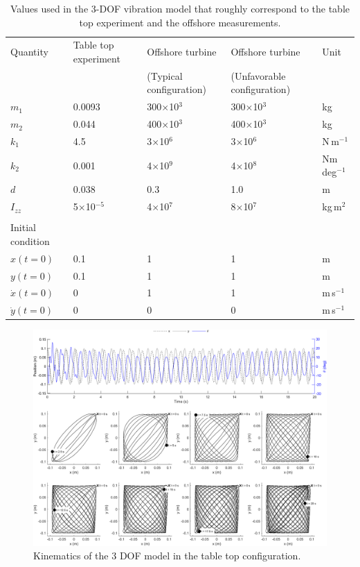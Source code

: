 \documentclass{article}
\begin{document}
\begin{table}[]
    \centering
    \begin{tabular}{l l l ll }
    \toprule
         Quantity & Table top experiment & Offshore turbine &  Offshore turbine & Unit \\
         & & (Typical configuration) & (Unfavorable configuration)\\
         \midrule
         $m_1$ & 0.0093 & 300$\times$10$^3$ & 300$\times$10$^3$ & kg\\ 
         $m_2$ & 0.044 & 400$\times$10$^3$ & 400$\times$10$^3$ & kg\\ 
         $k_1$ & 4.5 & 3$\times$10$^6$ & 3$\times$10$^6$ & N\,m$^{-1}$ \\ 
         $k_2$ & 0.001 & 4$\times$10$^9$ & 4$\times$10$^8$ & Nm\,deg$^{-1}$ \\ 
         $d$ & 0.038 & 0.3 & 1.0 & m\\ 
         $I_{zz}$ & 5$\times$10$^{-5}$ & 4$\times$10$^7$ & 8$\times$10$^7$ & kg\,m$^2$ \\
         \\
         Initial condition & \\
         \midrule
         $x(t=0)$ & 0.1 & 1 & 1 & m\\ 
         $y(t=0)$ & 0.1 & 1 & 1 & m\\
         $\dot{x}(t=0)$ & 0 & 1 & 1 & m\,s$^{-1}$ \\
         $\dot{y}(t=0)$ & 0 & 0 & 0 & m\,s$^{-1}$ \\
         \bottomrule
    \end{tabular}
    \caption{Values used in the 3-DOF vibration model that roughly correspond to the table top experiment and the offshore measurements.}
    \label{tab:3dof-variable-values}
\end{table}

\begin{figure}
    \centering
    \includegraphics[width=\textwidth]{manuscript/figures/tabletop.png}
    \caption{Kinematics of the 3 DOF model in the table top configuration.}
    \label{fig:3dof-tabletop}
\end{figure}
\end{document}
